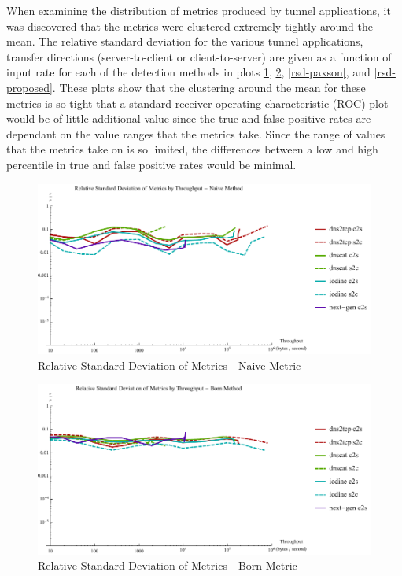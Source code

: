 \documentclass[12pt]{report}
\theoremstyle{remark}
\theoremstyle{definition}
\theoremstyle{definition}
\theoremstyle{definition}
\begin{document}
When examining the distribution of metrics produced by tunnel applications, it
was discovered that the metrics were clustered extremely tightly around the
mean. The relative standard deviation for the various tunnel applications,
transfer directions (server-to-client or client-to-server) are given as a
function of input rate for each of the detection methods in plots
\ref{rsd-naive}, \ref{rsd-born}, \ref{rsd-paxson}, and \ref{rsd-proposed}. These
plots show that the clustering around the mean for these metrics is so tight
that a standard receiver operating characteristic (ROC) plot would be of little
additional value since the true and false positive rates are dependant on the
value ranges that the metrics take. Since the range of values that the metrics
take on is so limited, the differences between a low and high percentile in true
and false positive rates would be minimal.

\begin{figure}
\centering
\includegraphics[width=\textwidth]{../figures/rsd-naive.pdf}
\caption[Relative Standard Deviation of Metrics - Naive Metric]{Relative Standard Deviation of Metrics - Naive Metric}
\label{rsd-naive}
\end{figure}

\begin{figure}
\centering
\includegraphics[width=\textwidth]{../figures/rsd-born.pdf}
\caption[Relative Standard Deviation of Metrics - Born Metric]{Relative Standard Deviation of Metrics - Born Metric}
\label{rsd-born}
\end{figure}
\end{document}
